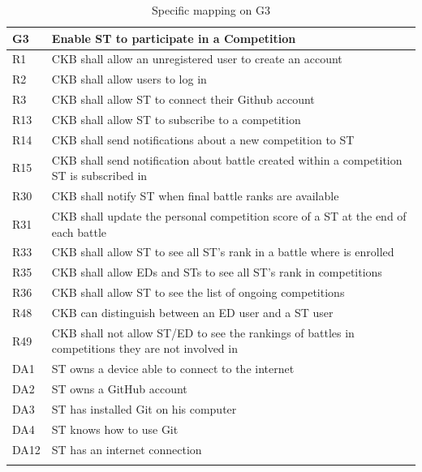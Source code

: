   \pagebreak 


  \begin{longtable}{|l|p{12cm}| }
    \hline
    \textbf{G3} & \textbf{Enable ST to participate in a Competition}      \\
    \hline
    R1 & CKB shall allow an unregistered user to create an account \\
    \hline
    R2 & CKB shall allow users to log in \\
    \hline
    R3 & CKB shall allow ST to connect their Github account \\
    \hline
    R13 & CKB shall allow ST to subscribe to a competition \\
    \hline
    R14 & CKB shall send notifications about a new competition to ST \\
    \hline
    R15 & CKB shall send notification about battle created within a competition ST is subscribed in \\
    \hline
    R30 & CKB shall notify ST when final battle ranks are available \\
    \hline
    R31 & CKB shall update the personal competition score of a ST at the end of each battle \\
    \hline
    R33 & CKB shall allow ST to see all ST’s rank in a battle where is enrolled \\
    \hline
    R35 & CKB shall allow EDs and STs to see all ST’s rank in competitions \\
    \hline
    R36 & CKB shall allow ST to see the list of ongoing competitions \\
    \hline
    R48 & CKB can distinguish between an ED user and a ST user \\
    \hline
    R49 & CKB shall not allow ST/ED to see the rankings of battles in competitions they are not involved in \\
    \hline
    DA1 & ST owns a device able to connect to the internet \\
    \hline
    DA2 & ST owns a GitHub account \\
    \hline
    DA3 & ST has installed Git on his computer \\
    \hline
    DA4 & ST knows how to use Git \\
    \hline
    DA12 & ST has an internet connection \\
    \hline

    \caption{Specific mapping on G3}
    \label{tab:mappingG3}
  \end{longtable}

